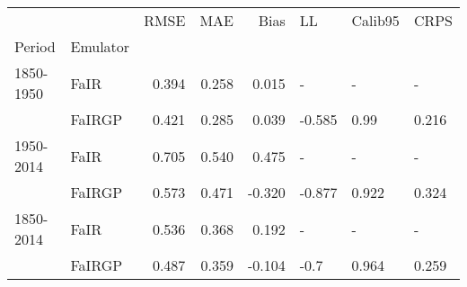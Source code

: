 \begin{tabular}{llrrrlll}
\toprule
          &        &   RMSE &    MAE &   Bias &     LL & Calib95 &   CRPS \\
Period & Emulator &        &        &        &        &         &        \\
\midrule
1850-1950 & FaIR &  0.394 &  0.258 &  0.015 &      - &       - &      - \\
          & FaIRGP &  0.421 &  0.285 &  0.039 & -0.585 &    0.99 &  0.216 \\
1950-2014 & FaIR &  0.705 &  0.540 &  0.475 &      - &       - &      - \\
          & FaIRGP &  0.573 &  0.471 & -0.320 & -0.877 &   0.922 &  0.324 \\
1850-2014 & FaIR &  0.536 &  0.368 &  0.192 &      - &       - &      - \\
          & FaIRGP &  0.487 &  0.359 & -0.104 &   -0.7 &   0.964 &  0.259 \\
\bottomrule
\end{tabular}
